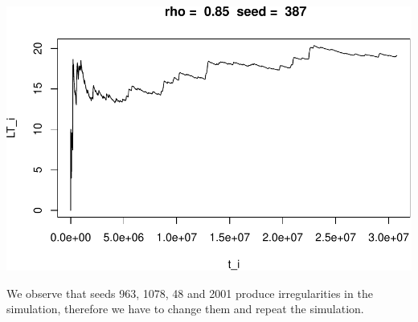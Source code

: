 \documentclass[]{article}
\begin{document}
\includegraphics{003_files/figure-latex/unnamed-chunk-20-10.pdf}

We observe that seeds 963, 1078, 48 and 2001 produce irregularities in
the simulation, therefore we have to change them and repeat the
simulation.
\end{document}
